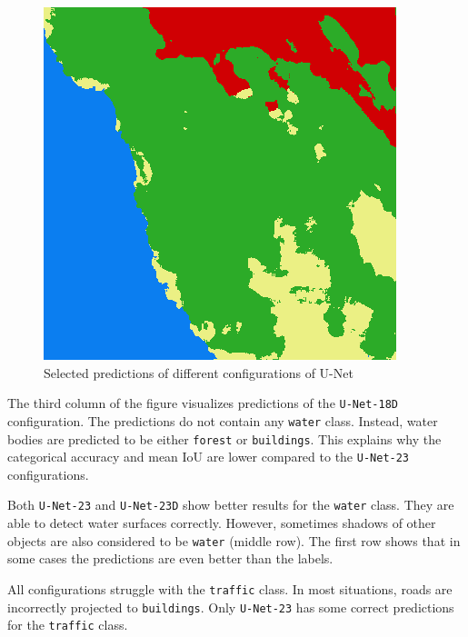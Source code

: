 \begin{figure}
    \includegraphics[width=\UnetPredictionsImageWidth]{images/unet/unet-23D/147352-prediction}

    \caption{Selected predictions of different configurations of U-Net}
    \label{fig:unet_prediction_images}
\end{figure}

The third column of the figure visualizes predictions of the \texttt{U-Net-18D} configuration. The predictions do not contain any \texttt{water} class. Instead, water bodies are predicted to be either \texttt{forest} or \texttt{buildings}. This explains why the categorical accuracy and mean IoU are lower compared to the \texttt{U-Net-23} configurations.

Both \texttt{U-Net-23} and \texttt{U-Net-23D} show better results for the \texttt{water} class. They are able to detect water surfaces correctly. However, sometimes shadows of other objects are also considered to be \texttt{water} (middle row). The first row shows that in some cases the predictions are even better than the labels.

All configurations struggle with the \texttt{traffic} class. In most situations, roads are incorrectly projected to \texttt{buildings}. Only \texttt{U-Net-23} has some correct predictions for the \texttt{traffic} class.

